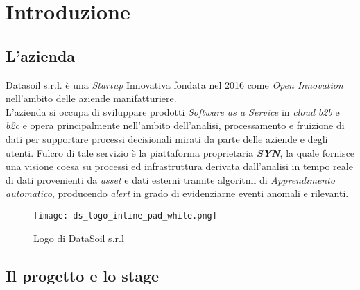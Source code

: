 
\chapter{Introduzione}
\label{cap:introduzione}


\section{L'azienda}

Datasoil s.r.l. è una \textit{Startup} Innovativa fondata nel 2016 come \textit{Open Innovation} nell'ambito delle aziende manifatturiere.\\
L'azienda si occupa di sviluppare prodotti \textit{Software as a Service} in \textit{cloud} \textit{\gls{b2b}} e \textit{\gls{b2c}} e opera principalmente nell'ambito dell'analisi, processamento e fruizione di dati per supportare processi decisionali mirati da parte delle aziende e degli utenti. Fulcro di tale servizio è la piattaforma proprietaria \textbf{\textit{SYN}}, la quale fornisce una visione coesa su processi ed infrastruttura derivata dall'analisi in tempo reale di dati provenienti da \textit{asset} e dati esterni tramite algoritmi di \textit{\gls{Apprendimento automatico}}, producendo \textit{alert} in grado di evidenziarne eventi anomali e rilevanti.

\begin{figure}[!h] 
    \centering 
    \texttt{[image: ds\_logo\_inline\_pad\_white.png]} 
    \caption{Logo di DataSoil s.r.l}
\end{figure}

\section{Il progetto e lo stage}

